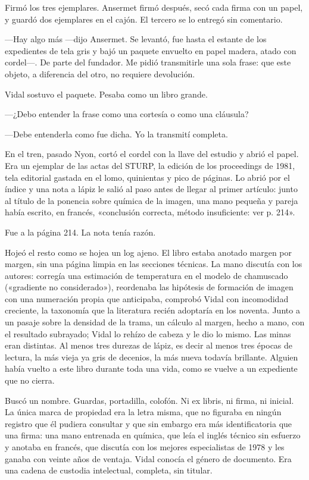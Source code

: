 Firmó los tres ejemplares. Ansermet firmó después, secó cada firma con un papel, y guardó dos ejemplares en el cajón. El tercero se lo entregó sin comentario.

---Hay algo más ---dijo Ansermet. Se levantó, fue hasta el estante de los expedientes de tela gris y bajó un paquete envuelto en papel madera, atado con cordel---. De parte del fundador. Me pidió transmitirle una sola frase: que este objeto, a diferencia del otro, no requiere devolución.

Vidal sostuvo el paquete. Pesaba como un libro grande.

---¿Debo entender la frase como una cortesía o como una cláusula?

---Debe entenderla como fue dicha. Yo la transmití completa.


\scenebreak


En el tren, pasado Nyon, cortó el cordel con la llave del estudio y abrió el papel. Era un ejemplar de las actas del STURP, la edición de los proceedings de 1981, tela editorial gastada en el lomo, quinientas y pico de páginas. Lo abrió por el índice y una nota a lápiz le salió al paso antes de llegar al primer artículo: junto al título de la ponencia sobre química de la imagen, una mano pequeña y pareja había escrito, en francés, «conclusión correcta, método insuficiente: ver p. 214».

Fue a la página 214. La nota tenía razón.

Hojeó el resto como se hojea un log ajeno. El libro estaba anotado margen por margen, sin una página limpia en las secciones técnicas. La mano discutía con los autores: corregía una estimación de temperatura en el modelo de chamuscado («gradiente no considerado»), reordenaba las hipótesis de formación de imagen con una numeración propia que anticipaba, comprobó Vidal con incomodidad creciente, la taxonomía que la literatura recién adoptaría en los noventa. Junto a un pasaje sobre la densidad de la trama, un cálculo al margen, hecho a mano, con el resultado subrayado; Vidal lo rehízo de cabeza y le dio lo mismo. Las minas eran distintas. Al menos tres durezas de lápiz, es decir al menos tres épocas de lectura, la más vieja ya gris de decenios, la más nueva todavía brillante. Alguien había vuelto a este libro durante toda una vida, como se vuelve a un expediente que no cierra.

Buscó un nombre. Guardas, portadilla, colofón. Ni ex libris, ni firma, ni inicial. La única marca de propiedad era la letra misma, que no figuraba en ningún registro que él pudiera consultar y que sin embargo era más identificatoria que una firma: una mano entrenada en química, que leía el inglés técnico sin esfuerzo y anotaba en francés, que discutía con los mejores especialistas de 1978 y les ganaba con veinte años de ventaja. Vidal conocía el género de documento. Era una cadena de custodia intelectual, completa, sin titular.

